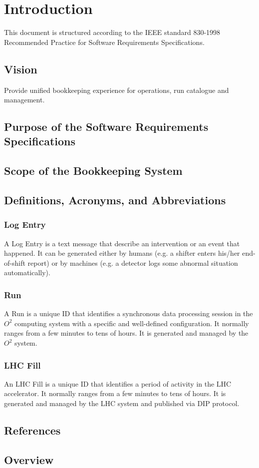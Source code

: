 
\chapter{Introduction}
This document is structured according to the IEEE standard 830-1998 Recommended Practice for Software Requirements Specifications.

\section{Vision}
 Provide unified bookkeeping experience for operations, run catalogue and management.
 
\section{Purpose of the Software Requirements Specifications}

\section{Scope of the Bookkeeping System}

\section{Definitions, Acronyms, and Abbreviations}

\subsection{Log Entry}
A Log Entry is a text message that describe an intervention or an event that happened. It can be generated either by humans (e.g. a shifter enters his/her end-of-shift report) or by machines (e.g. a detector logs some abnormal situation automatically). 

\subsection{Run}
A Run is a unique ID that identifies a synchronous data processing session in the $O^2$ computing system with a specific and well-defined configuration. It normally ranges from a few minutes to tens of hours. It is generated and managed by the $O^2$ system. 

\subsection{LHC Fill}
An LHC Fill is a unique ID that identifies a period of activity in the LHC accelerator. It normally ranges from a few minutes to tens of hours. It is generated and managed by the LHC system and published via DIP protocol. 


\section{References}

\section{Overview}

